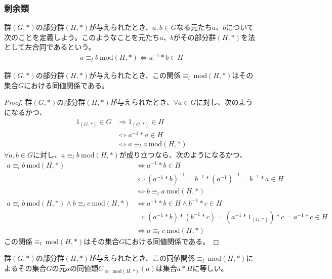 \documentclass[dvipdfmx]{jsarticle}
\begin{document}
\subsubsection{剰余類}%
\begin{dfn}
群$(G,*)$の部分群$(H,*)$が与えられたとき、$a,b \in G$なる元たち$a$、$b$について次のことを定義しよう。このようなことを元たち$a$、$b$がその部分群$(H,*)$を法として左合同であるという。
\begin{align*}
a \equiv_{l}b\ \mathrm{mod}(H,*) \Leftrightarrow a^{- 1}*b \in H
\end{align*}
\end{dfn}
\begin{thm}\label{3.1.1.12}
群$(G,*)$の部分群$(H,*)$が与えられたとき、この関係$\equiv_{l}\ \mathrm{mod}(H,*)$はその集合$G$における同値関係である。
\end{thm}
\begin{proof}
群$(G,*)$の部分群$(H,*)$が与えられたとき、$\forall a \in G$に対し、次のようになるかつ、
\begin{align*}
1_{(G,*)} \in G &\Rightarrow 1_{(G,*)} \in H\\
&\Leftrightarrow a^{- 1}*a \in H\\
&\Leftrightarrow a \equiv_{l}a\ \mathrm{mod}(H,*)
\end{align*}
$\forall a,b \in G$に対し、$a \equiv_{l}b\ \mathrm{mod}(H,*)$が成り立つなら、次のようになるかつ、
\begin{align*}
a \equiv_{l}b\ \mathrm{mod}(H,*) &\Leftrightarrow a^{- 1}*b \in H\\
&\Leftrightarrow \left( a^{- 1}*b \right)^{- 1} = b^{- 1}*\left( a^{- 1} \right)^{- 1} = b^{- 1}*a \in H\\
&\Leftrightarrow b \equiv_{l}a\ \mathrm{mod}(H,*) \\
a \equiv_{l}b\ \mathrm{mod}(H,*) \land b \equiv_{l}c\ \mathrm{mod}(H,*) &\Leftrightarrow a^{- 1}*b \in H \land b^{- 1}*c \in H\\
&\Rightarrow \left( a^{- 1}*b \right)*\left( b^{- 1}*c \right) = \left( a^{- 1}*1_{(G,*)} \right)*c = a^{- 1}*c \in H\\
&\Leftrightarrow a \equiv_{l}c\ \mathrm{mod}(H,*)
\end{align*}
この関係$\equiv_{l}\ \mathrm{mod}(H,*)$はその集合$G$における同値関係である。
\end{proof}
\begin{thm}\label{3.1.1.13}
群$(G,*)$の部分群$(H,*)$が与えられたとき、この同値関係$\equiv_{l}\ \mathrm{mod}(H,*)$によるその集合$G$の元$a$の同値類$C_{\equiv_{l}\ \mathrm{mod}(H,*)}(a)$は集合$a*H$に等しい。
\end{thm}
\end{document}
